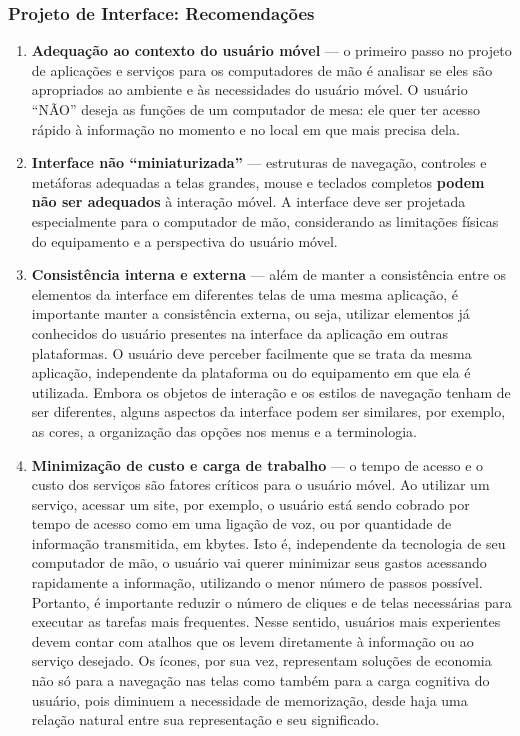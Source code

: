 \documentclass[presentation]{beamer}
\begin{document}
\begin{frame}[allowframebreaks]\frametitle{Projeto de Interface: Recomendações}
    
    \begin{enumerate}
        \item \textbf{Adequação ao contexto do usuário móvel} --- o primeiro passo no projeto de aplicações e serviços para os computadores de mão é analisar se eles são apropriados ao ambiente e às necessidades do usuário móvel. O usuário ``NÃO'' deseja as funções de um computador de mesa: ele quer ter acesso rápido à informação no momento e no local em que mais precisa dela. \newpage
        \item \textbf{Interface não ``miniaturizada''} --- estruturas de navegação, controles e metáforas adequadas a telas grandes, mouse e teclados completos \textbf{podem não ser adequados} à interação móvel. A interface deve ser projetada especialmente para o computador de mão, considerando as limitações físicas do equipamento e a perspectiva do usuário móvel. \newpage
        \item \textbf{Consistência interna e externa} --- além de manter a consistência entre os elementos da interface em diferentes telas de uma mesma aplicação, é importante manter a consistência externa, ou seja, utilizar elementos já conhecidos do usuário presentes na interface da aplicação em outras plataformas. O usuário deve perceber facilmente que se trata da mesma aplicação, independente da plataforma ou do equipamento em que ela é utilizada. Embora os objetos de interação e os estilos de navegação tenham de ser diferentes, alguns aspectos da interface podem ser similares, por exemplo, as cores, a organização das opções nos menus e a terminologia.\newpage
        \item \textbf{Minimização de custo e carga de trabalho} --- o tempo de acesso e o custo dos serviços são fatores críticos para o usuário móvel. Ao utilizar um serviço, acessar um site, por exemplo, o usuário está sendo cobrado por tempo de acesso como em uma ligação de voz, ou por quantidade de informação transmitida, em kbytes. Isto é, independente da tecnologia de seu computador de mão, o usuário vai querer minimizar seus gastos acessando rapidamente a informação, utilizando o menor número de passos possível. Portanto, é importante reduzir o número de cliques e de telas necessárias para executar as tarefas mais frequentes. Nesse sentido, usuários mais experientes devem contar com atalhos que os levem diretamente à informação ou ao serviço desejado. Os ícones, por sua vez, representam soluções de economia não só para a navegação nas telas como também para a carga cognitiva do usuário, pois diminuem a necessidade de memorização, desde haja uma relação natural entre sua representação e seu significado. \newpage 

\end{enumerate}
\end{frame}
\end{document}
